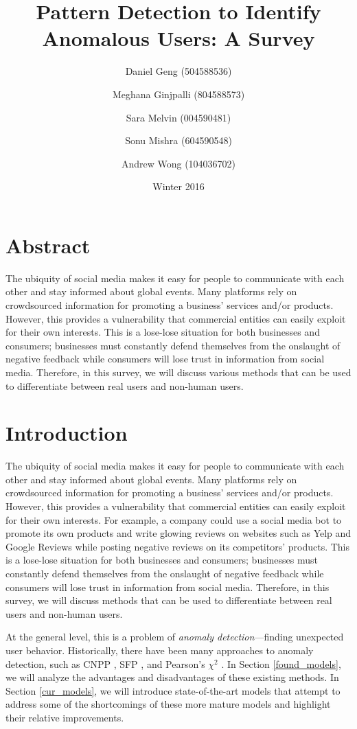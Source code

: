 \documentclass[11pt, oneside]{article}   	%
\title{Pattern Detection to Identify Anomalous Users: A Survey}
\author{
  Daniel Geng (504588536)\\
  \and
  Meghana Ginjpalli (804588573)\\
  \and
  Sara Melvin (004590481)\\
  \and
  Sonu Mishra (604590548)\\
  \and
  Andrew Wong (104036702)
}
\date{Winter 2016}							%
\begin{document}
\maketitle

\section*{Abstract}
The ubiquity of social media makes it easy for people to communicate with each other and stay informed about global events.
Many platforms rely on crowdsourced information for promoting a business' services and/or products.
However, this provides a vulnerability that commercial entities can easily exploit for their own interests. This is a lose-lose situation for both businesses and consumers; businesses must constantly defend themselves from the onslaught of negative feedback while consumers will lose trust in information from social media.
Therefore, in this survey, we will discuss various methods that can be used to differentiate between real users and non-human users.

\section{Introduction} \label{background}

\quad The ubiquity of social media makes it easy for people to communicate with each other and stay informed about global events.
Many platforms rely on crowdsourced information for promoting a business' services and/or products.
However, this provides a vulnerability that commercial entities can easily exploit for their own interests.
For example, a company could use a social media bot to promote its own products and write glowing reviews on websites such as Yelp and Google Reviews while posting negative reviews on its competitors' products.
This is a lose-lose situation for both businesses and consumers; businesses must constantly defend themselves from the onslaught of negative feedback while consumers will lose trust in information from social media.
Therefore, in this survey, we will discuss methods that can be used to differentiate between real users and non-human users.

\quad At the general level, this is a problem of \textit{anomaly detection}---finding unexpected user behavior.
Historically, there have been many approaches to anomaly detection, such as CNPP \cite{cnpp}, SFP \cite{sfp}, and Pearson's $\chi^2$ \cite{pearson}.
In Section \ref{found_models}, we will analyze the advantages and disadvantages of these existing methods.
In Section \ref{cur_models}, we will introduce state-of-the-art models that attempt to address some of the shortcomings of these more mature models and highlight their relative improvements. 
\end{document}
